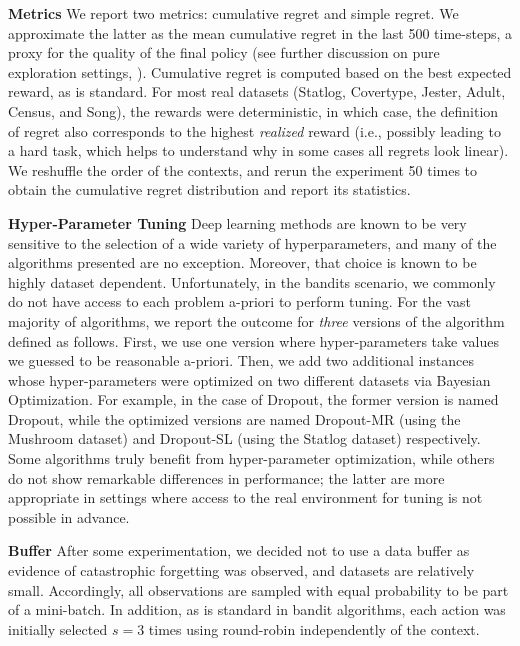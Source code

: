 \documentclass{article} \usepackage{iclr2018_conference,times}
\begin{document}
\textbf{Metrics}  We report two metrics: cumulative regret and simple regret.
We approximate the latter as the mean cumulative regret in the last 500 time-steps, a proxy for the quality of the final policy (see further discussion on pure exploration settings, \cite{bubeck2009pure}).
Cumulative regret is computed based on the best expected reward, as is standard.
For most real datasets (Statlog, Covertype, Jester, Adult, Census, and Song), the rewards were deterministic, in which case, the definition of regret also corresponds to the highest \emph{realized} reward (i.e., possibly leading to a hard task, which helps to understand why in some cases all regrets look linear).
We reshuffle the order of the contexts, and rerun the experiment 50 times to obtain the cumulative regret distribution and report its statistics.


\textbf{Hyper-Parameter Tuning} Deep learning methods are known to be very sensitive to the selection of a wide variety of hyperparameters, and many of the algorithms presented are no exception.  Moreover, that choice is known to be highly dataset dependent.  Unfortunately, in the bandits scenario, we commonly do not have access to each problem a-priori to perform tuning.
For the vast majority of algorithms, we report the outcome for \emph{three} versions of the algorithm defined as follows.
First, we use one version where hyper-parameters take values we guessed to be reasonable a-priori.
Then, we add two additional instances whose hyper-parameters were optimized on two different datasets via Bayesian Optimization.
For example, in the case of Dropout, the former version is named Dropout, while the optimized versions are named Dropout-MR (using the Mushroom dataset) and Dropout-SL (using the Statlog dataset) respectively.
Some algorithms truly benefit from hyper-parameter optimization, while others do not show remarkable differences in performance; the latter are more appropriate in settings where access to the real environment for tuning is not possible in advance.


\textbf{Buffer} After some experimentation, we decided not to use a data buffer as evidence of catastrophic forgetting was observed, and datasets are relatively small.
Accordingly, all observations are sampled with equal probability to be part of a mini-batch.
In addition, as is standard in bandit algorithms, each action was initially selected $s = 3$ times using round-robin independently of the context.
\end{document}
